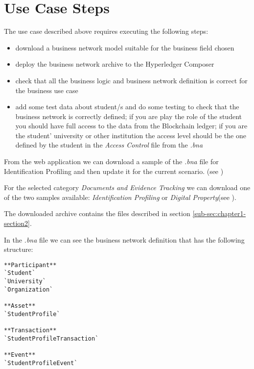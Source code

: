 \section{Use Case Steps}
\label{sub-sec:chapter4-section2}
The use case described above requires executing the following steps:
\begin{itemize}
	\item download a business network model suitable for the business field chosen
	\item deploy the business network archive to the Hyperledger Composer
	\item check that all the business logic and  business network definition is correct for the business use case
	\item add some test data about student/s and do some testing to check that the business network is correctly defined; if you are play the role of the student you should have full access to the data from the Blockchain ledger; if you are the student' university or other institution the access level should be the one defined by the student in the \emph{Access Control} file from the \emph{.bna}	
\end{itemize}

From the web application we can download a sample of the \emph{.bna} file for Identification Profiling and then update it for the current scenario. (see )

For the selected category \emph{Documents and Evidence Tracking} we can download one of the two samples available: \emph{Identification Profiling} or \emph{Digital Property}(see ).

The downloaded archive contains the files described in section \ref{sub-sec:chapter1-section2}.


In the \emph{.bna} file we can see the business network definition that has the following structure:
\begin{verbatim}
**Participant**
`Student`
`University`
`Organization`

**Asset**
`StudentProfile`

**Transaction**
`StudentProfileTransaction`

**Event**
`StudentProfileEvent`
\end{verbatim}

